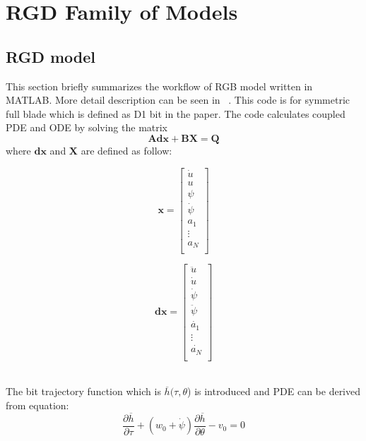 \chapter{RGD Family of Models}

\section{RGD model}

This section briefly summarizes the workflow of RGB model written in MATLAB. More detail description can be seen in ~\cite{ref:zhang2020a}.  This code is for symmetric full blade which is defined as D1 bit in the paper.  The code calculates coupled PDE and ODE by solving the matrix
\begin{equation}\label{matrix}
  \bm{Adx} + \bm{BX} = \bm{Q}
\end{equation}
where $\bm{dx}$ and $\bm{X}$ are defined as follow:

\noindent\begin{minipage}{.5\linewidth}
\begin{equation}
\bm{x}=
\begin{bmatrix}
\dot{u} \\
u \\
\psi \\
\dot{\psi} \\
a_1\ \\
\vdots \\
a_N \\
\end{bmatrix}
\end{equation}
\end{minipage}%
\begin{minipage}{.5\linewidth}
\begin{equation}
\bm{dx}=
\begin{bmatrix}
\ddot{u} \\
\dot{u} \\
\dot{\psi} \\
\ddot{\psi} \\
\dot{a_1}\ \\
\vdots \\
\dot{a_N} \\
\end{bmatrix}
\end{equation}
\end{minipage} \\

The bit trajectory function which is $\overline{h}(\tau, \theta$) is introduced and PDE can be derived from equation:
\begin{equation}\label{PDE}
\frac{\partial \overline{h}}{\partial \tau} + (w_0 + \dot{\psi})\frac{\partial \overline{h}}{\partial \theta}-v_0 = 0
\end{equation}


